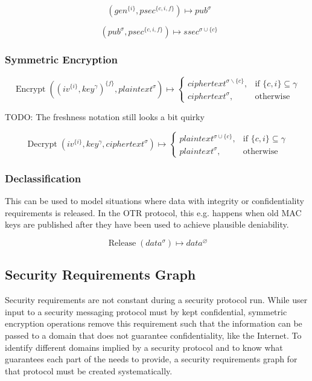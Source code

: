\documentclass[a4paper]{article}
\DeclareMathOperator{\enc}{Encrypt}
\DeclareMathOperator{\dec}{Decrypt}
\DeclareMathOperator{\dhsec}{DH_{Sec}}
\DeclareMathOperator{\dhpub}{DH_{Pub}}
\DeclareMathOperator{\release}{Release}
\newcommand{\TODO}[1]{\small\noindent\color{red} TODO: #1\color{black}}
\newcommand{\emptysec}{\varnothing}
\newcommand{\secminus}{\smallsetminus}
\begin{document}
$$\dhpub(gen^{\{i\}}, psec^{\{c,i,f\}}) \mapsto pub^\sigma$$

$$\dhsec(pub^\sigma, psec^{\{c,i,f\}}) \mapsto ssec^{\sigma\cup\{c\}} $$

\subsubsection{Symmetric Encryption}

\begin{equation*}
    \enc((iv^{\{i\}}, key^\gamma)^{\{f\}}, plaintext^\sigma) \mapsto
    \begin{cases}
        ciphertext^{\sigma\secminus\{c\}}, & \text{if $\{c,i\} \subseteq \gamma$} \\
        ciphertext^{\sigma},               & \text{otherwise}
    \end{cases}
\end{equation*}

\TODO{The freshness notation still looks a bit quirky}

\begin{equation*}
    \dec(iv^{\{i\}}, key^\gamma, ciphertext^\sigma) \mapsto
    \begin{cases}
        plaintext^{\sigma\cup\{c\}}, & \text{if $\{c,i\} \subseteq \gamma$} \\
        plaintext^{\sigma},          & \text{otherwise}
    \end{cases}
\end{equation*}

\subsubsection{Declassification}

This can be used to model situations where data with integrity or
confidentiality requirements is released. In the OTR protocol, this e.g.
happens when old MAC keys are published after they have been used to achieve
plausible deniability.

$$\release(data^\sigma) \mapsto data^\emptysec $$

\subsection{Security Requirements Graph}

Security requirements are not constant during a security protocol run. While
user input to a security messaging protocol must by kept confidential,
symmetric encryption operations remove this requirement such that the
information can be passed to a domain that does not guarantee confidentiality,
like the Internet. To identify different domains implied by a security protocol
and to know what guarantees each part of the needs to provide, a security
requirements graph for that protocol must be created systematically.
\end{document}
